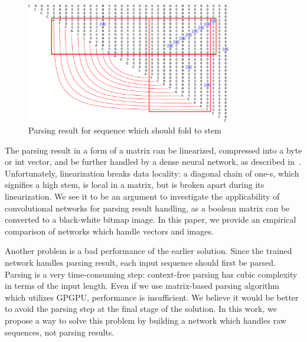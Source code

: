 \begin{figure}[h]
\begin{center}
\centering
\includegraphics[width=0.8\textwidth]{figures/4.pdf}
\caption{Parsing result for sequence which should fold to
stem}
\label{fig:example}
\end{center}
\end{figure}

The parsing result in a form of a matrix can be linearized, compressed into a byte or int vector, and be further handled by a dense neural network, as described in~\cite{grigorevcomposition}.
Unfortunately, linearization breaks data locality: a diagonal chain of one-s, which signifies a high stem, is local in a matrix, but is broken apart during its linearization.
We see it to be an argument to investigate the applicability of convolutional networks for parsing result handling, as a boolean matrix can be converted to a black-white bitmap image.
In this paper, we provide an empirical comparison of networks which handle vectors and images.

Another problem is a bad performance of the earlier solution.
Since the trained network handles parsing result, each input sequence should first be parsed.
Parsing is a very time-consuming step: context-free parsing has cubic complexity in terms of the input length.
Even if we use matrix-based parsing algorithm~\cite{Azimov:2018:CPQ:3210259.3210264} which utilizes GPGPU, performance is insufficient.
We believe it would be better to avoid the parsing step at the final stage of the solution.
In this work, we propose a way to solve this problem by building a network which handles raw sequences, not parsing results.
